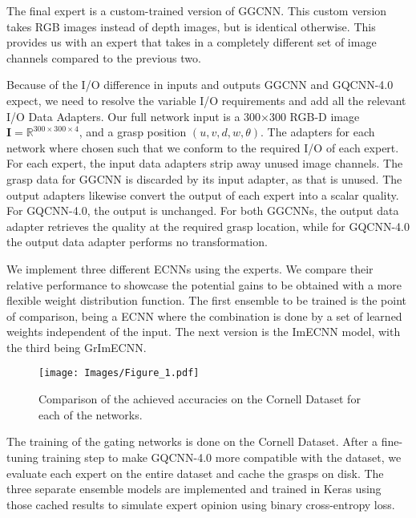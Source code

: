 \documentclass[letterpaper, 10 pt, conference]{ieeeconf}
\begin{document}
The final expert is a custom-trained version of GGCNN.  This custom version takes RGB images instead of depth images, but is identical otherwise. This provides us with an expert that takes in a completely different set of image channels compared to the previous two.

Because of the I/O difference in inputs and outputs GGCNN and GQCNN-4.0 expect, we need to resolve the variable I/O requirements and add all the relevant I/O Data Adapters.  Our full network input is a 300×300 RGB-D image $\mathbf{I}=\mathbb{R}^{300 \times 300 \times 4}$, and a grasp position $(u, v, d, w, \theta)$.  The adapters for each network where chosen such that we conform to the required I/O of each expert. For each expert, the input data adapters strip away unused image channels. The grasp data for GGCNN is discarded by its input adapter, as that is unused. The output adapters likewise convert the output of each expert into a scalar quality. For GQCNN-4.0, the output is unchanged. For both GGCNNs, the output data adapter retrieves the quality at the required grasp location, while for GQCNN-4.0 the output data adapter performs no transformation.

We implement three different ECNNs using the experts. We compare their relative performance to showcase the potential gains to be obtained with a more flexible weight distribution function. The first ensemble to be trained is the point of comparison, being a ECNN where the combination is done by a set of learned weights independent of the input. The next version is the ImECNN model, with the third being GrImECNN.

\begin{figure}
  \texttt{[image: Images/Figure\_1.pdf]}
  \caption{Comparison of the achieved accuracies on the Cornell Dataset for each of the networks.}
  \label{fig:comp}
 \vspace{-12pt}
\end{figure}

The training of the gating networks is done on the Cornell Dataset. After a fine-tuning training step to make GQCNN-4.0 more compatible with the dataset, we evaluate each expert on the entire dataset and cache the grasps on disk. The three separate ensemble models are implemented and trained in Keras using those cached results to simulate expert opinion using binary cross-entropy loss.
\end{document}
